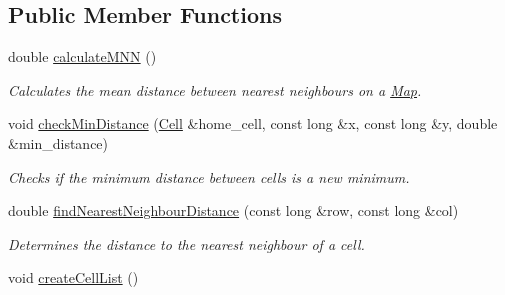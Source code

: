 \subsection*{Public Member Functions}
\begin{DoxyCompactItemize}
\item 
double \hyperlink{class_landscape_metrics_calculator_a34f344e3282eead2091fe8ccb32e6d48}{calculate\+M\+NN} ()
\begin{DoxyCompactList}\small\item\em Calculates the mean distance between nearest neighbours on a \hyperlink{class_map}{Map}. \end{DoxyCompactList}\item 
void \hyperlink{class_landscape_metrics_calculator_a16bde8469f437abc21602eedb979e5e3}{check\+Min\+Distance} (\hyperlink{struct_cell}{Cell} \&home\+\_\+cell, const long \&x, const long \&y, double \&min\+\_\+distance)
\begin{DoxyCompactList}\small\item\em Checks if the minimum distance between cells is a new minimum. \end{DoxyCompactList}\item 
double \hyperlink{class_landscape_metrics_calculator_a9dd4cde4aad066b3b204553718a63a98}{find\+Nearest\+Neighbour\+Distance} (const long \&row, const long \&col)
\begin{DoxyCompactList}\small\item\em Determines the distance to the nearest neighbour of a cell. \end{DoxyCompactList}\item 
void \hyperlink{class_landscape_metrics_calculator_a084eea2435b7d15049873ae4613b0307}{create\+Cell\+List} ()\hypertarget{class_landscape_metrics_calculator_a084eea2435b7d15049873ae4613b0307}{}\label{class_landscape_metrics_calculator_a084eea2435b7d15049873ae4613b0307}


\end{DoxyCompactItemize}
